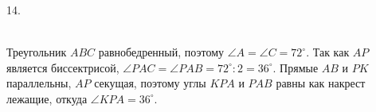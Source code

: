 14. \begin{figure}[ht!]
\end{figure}\\
Треугольник $ABC$ равнобедренный, поэтому $\angle A=\angle C =72^\circ.$ Так как $AP$ является биссектрисой, $\angle PAC=\angle PAB=72^\circ:2=36^\circ.$ Прямые $AB$ и $PK$ параллельны, $AP$ секущая, поэтому углы $KPA$ и $PAB$ равны как накрест лежащие, откуда $\angle KPA=36^\circ.$\\
